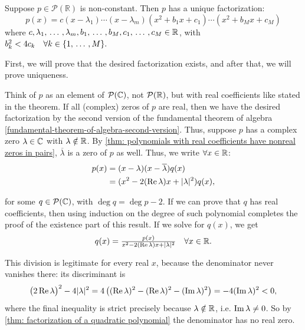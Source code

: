 \begin{thm}
  \label{thm: factorization of a polynomial over R}
  Suppose $p \in \mathcal{P}(\mathbb{R})$ is non-constant. Then $p$ has a unique factorization:
  \begin{equation}
    p(x) = c(x-\lambda_1) \cdots (x-\lambda_m)(x^2+b_1x+c_1) \cdots (x^2+b_Mx+c_M)
  \end{equation}
  where $c, \lambda_1, {\, \ldots \,\,}, \lambda_m, b_1, {\, \ldots \,\,}, b_M, c_1, {\, \ldots \,\,}, c_M \in \mathbb{R}$, with $b_k^2 < 4c_k \quad \forall k \in \{1, {\, \ldots \,\,}, M\}.$
\end{thm}
\begin{prf}
  First, we will prove that the desired factorization exists, and after that, we will prove uniqueness.

  Think of $p$ as an element of $\mathcal{P}(\mathbb{C})$, not $\mathcal{P}(\mathbb{R})$, but with real coefficients like stated in the theorem. If all (complex) zeros of $p$ are real, then we have the desired factorization by the second version of the fundamental theorem of algebra \ref{fundamental-theorem-of-algebra-second-version}. Thus, suppose $p$ has a complex zero $\lambda \in \mathbb{C}$ with $\lambda \notin \mathbb{R}$. By \ref{thm: polynomials with real coefficients have nonreal zeros in pairs}, $\overline \lambda$ is a zero of $p$ as well. Thus, we write $\forall x \in \mathbb{R}$:
  \[
  \begin{aligned}
    p(x)
    &= (x - \lambda) (x-\overline \lambda) q(x) \\
    &= (x^2 - 2 (\operatorname{Re}  \lambda)x +  |\lambda|^2) q(x),  \\
  \end{aligned}
  \]

  for some $q \in \mathcal{P}(\mathbb{C})$, with $\deg q = \deg p -2$. If we can prove that $q$ has real coefficients, then using induction on the degree of such polynomial completes the proof of the existence part of this result. If we solve for $q(x)$, we get
  \[
    q(x) = \tfrac{p(x)}{x^2 - 2(\operatorname{Re} \lambda) x  + |\lambda|^2} \quad \forall x \in \mathbb{R}.
  \]

  This division is legitimate for every real $x$, because the denominator never vanishes there: its discriminant is
  \begin{equation}
    \big(2 \operatorname{Re} \lambda\big)^2 - 4|\lambda|^2 = 4 \left( (\operatorname{Re} \lambda)^2 - (\operatorname{Re} \lambda)^2 - (\operatorname{Im} \lambda)^2 \right) = -4 (\operatorname{Im} \lambda)^2 < 0,
  \end{equation}
  where the final inequality is strict precisely because $\lambda \notin \mathbb{R}$, i.e. $\operatorname{Im} \lambda \neq 0$. So by \ref{thm: factorization of a quadratic polynomial} the denominator has no real zero.


\end{prf}

